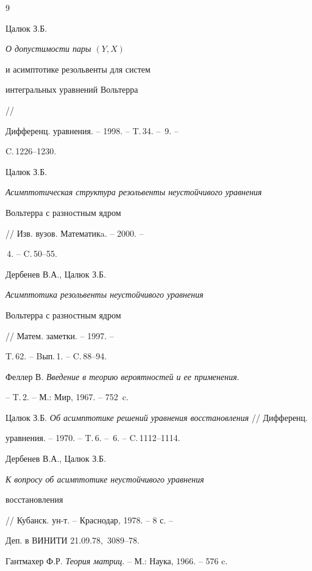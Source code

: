 \begin{thebibliography}{9}







Цалюк З.Б. {\em О допустимости пары $(Y,X)$ 


и асимптотике резольвенты для систем


интегральных уравнений Вольтерра} //


Дифференц. уравнения. -- 1998. -- T.\,34. -- \No\,9. --


C.\,1226--1230.




Цалюк З.Б. {\em Асимптотическая структура резольвенты неустойчивого уравнения


Вольтерра с разностным ядром} // Изв. вузов. Математикa. -- 2000. --


\No\,4. -- C.\,50--55.




Дербенев В.А., Цалюк З.Б. {\em Асимптотика резольвенты неустойчивого уравнения


Вольтерра с разностным ядром} // Матем. заметки. -- 1997. --


T.\,62. -- Bып.\,1. -- C.\,88--94.




Феллер В. {\em Введение в теорию вероятностей и ее применения}.


-- T.\,2. -- М.: Мир, 1967. -- 752~c.




Цалюк З.Б. {\em Об асимптотике решений уравнения восстановления} // Дифференц.


уравнения. -- 1970. -- T.\,6. -- \No\,6. -- C.\,1112--1114.




Дербенев В.А., Цалюк З.Б. {\em К вопросу об асимптотике неустойчивого уравнения


восстановления} // Кубанск. ун-т. --  Краснодар, 1978. -- 8 с. --


Деп. в ВИНИТИ 21.09.78, \No\,3089--78.




Гантмахер Ф.Р. {\em Теория матриц}. -- М.: Наука, 1966. -- 576 c.





\end{thebibliography}





\vskip 2cm












\label{end}








